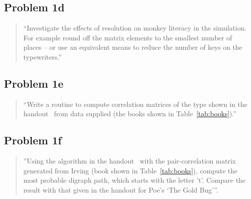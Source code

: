 \documentclass[conference]{IEEEtran}
\begin{document}
\begin{framed}
\fontsize{5.65}{6.78}\selectfont

\end{framed}

\subsection{Problem 1d}

\begin{quote}
``Investigate the effects of resolution on monkey literacy in the simulation. 
For example round off the matrix elements to the smallest number of places --
or use an equivalent means to reduce the number of keys on the typewriters.''
\end{quote}

\begin{framed}
\fontsize{5.65}{6.78}\selectfont

\end{framed}

\subsection{Problem 1e}

\begin{quote}
``Write a routine to compute correlation matrices of the type shown in the 
handout~\cite{Bennett1976} from data supplied (the books shown in Table~\ref{tab:books}).''
\end{quote}

\begin{framed}
\fontsize{5.65}{6.78}\selectfont

\end{framed}

\subsection{Problem 1f}

\begin{quote}
''Using the algorithm in the handout~\cite{Bennett1976} with the pair-correlation matrix 
generated from Irving (book shown in Table~\ref{tab:books}), compute the most 
probable digraph path, which starts with the letter 't'. Compare the result with 
that given in the handout for Poe's `The Gold Bug'''.
\end{quote}

\begin{framed}
\fontsize{5.65}{6.78}\selectfont

\end{framed}
\end{document}
